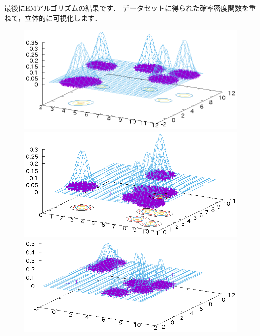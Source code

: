 ﻿\documentclass{jsarticle}
\begin{document}
最後にEMアルゴリズムの結果です．
データセットに得られた確率密度関数を重ねて，立体的に可視化します．
\begin{figure}[h]
\begin{center}
 \begin{minipage}{.32\textwidth}
 \begin{center}
 \includegraphics[height=.18\textheight]{fig/gmm2.eps}
 \end{center}
 \end{minipage}
 \begin{minipage}{.32\textwidth}
 \begin{center}
 \includegraphics[height=.18\textheight]{fig/gmm1.eps}
 \end{center}
 \end{minipage}
 \begin{minipage}{.32\textwidth}
 \begin{center}
 \includegraphics[height=.18\textheight]{fig/gmm3.eps}
 \end{center}
 \end{minipage}
\end{center}
\end{figure}
\end{document}
